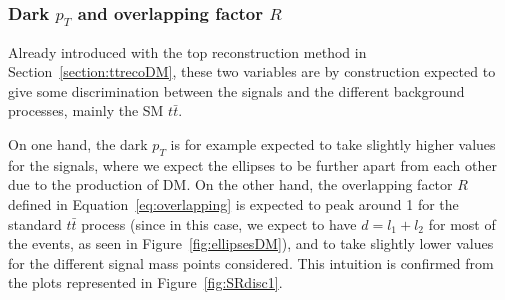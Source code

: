\documentclass[a4paper, 10pt, openright]{report}
\begin{document}

\subsubsection*{Dark $p_T$ and overlapping factor $R$}

Already introduced with the top reconstruction method in Section~\ref{section:ttrecoDM}, these two variables are by construction expected to give some discrimination between the signals and the different background processes, mainly the \ac{SM} $t \bar t$. 

On one hand, the dark $p_T$ is for example expected to take slightly higher values for the signals, where we expect the ellipses to be further apart from each other due to the production of \ac{DM}. On the other hand, the overlapping factor $R$ defined in Equation~\ref{eq:overlapping} is expected to peak around 1 for the standard $t \bar t$ process (since in this case, we expect to have $d = l_1 + l_2$ for most of the events, as seen in Figure~\ref{fig:ellipsesDM}), and to take slightly lower values for the different signal mass points considered. This intuition is confirmed from the plots represented in Figure~\ref{fig:SRdisc1}.
\end{document}

